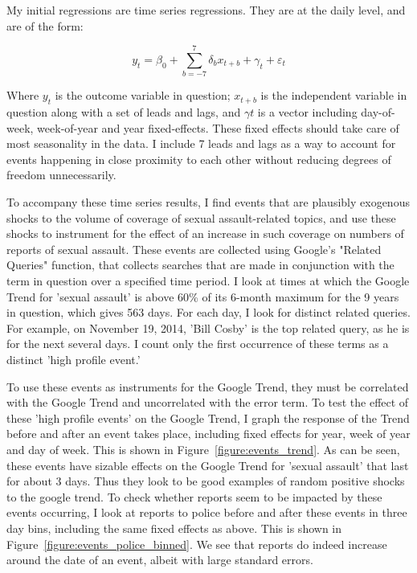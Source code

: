 \documentclass[AER,draftmode]{AEA}
\begin{document}
My initial regressions are time series regressions. They are at the daily level, and are of the form: 

$$ 
y_{t} = \beta_{0} + \sum_{b=-7}^{7} \delta_{b} x_{t+b} + \gamma_{t} + \varepsilon_{t}
$$

Where $y_{t}$ is the outcome variable in question; $x_{t+b}$ is the independent variable in question along with a set of leads and lags, and $\gamma{t}$ is a vector including day-of-week, week-of-year and year fixed-effects. These fixed effects should take care of most seasonality in the data. I include 7 leads and lags as a way to account for events happening in close proximity to each other without reducing degrees of freedom unnecessarily.

To accompany these time series results, I find events that are plausibly exogenous shocks to the volume of coverage of sexual assault-related topics, and use these shocks to instrument for the effect of an increase in such coverage on numbers of reports of sexual assault. These events are collected using Google's "Related Queries" function, that collects searches that are made in conjunction with the term in question over a specified time period. I look at times at which the Google Trend for 'sexual assault' is above 60\% of its 6-month maximum for the 9 years in question, which gives 563 days. For each day, I look for distinct related queries. For example, on November 19, 2014, 'Bill Cosby' is the top related query, as he is for the next several days. I count only the first occurrence of these terms as a distinct 'high profile event.' 

To use these events as instruments for the Google Trend, they must be correlated with the Google Trend and uncorrelated with the error term. To test the effect of these 'high profile events' on the Google Trend, I graph the response of the Trend before and after an event takes place, including fixed effects for year, week of year and day of week. This is shown in Figure~\ref{figure:events_trend}. As can be seen, these events have sizable effects on the Google Trend for 'sexual assault' that last for about 3 days. Thus they look to be good examples of random positive shocks to the google trend. To check whether reports seem to be impacted by these events occurring, I look at reports to police before and after these events in three day bins, including the same fixed effects as above. This is shown in Figure~\ref{figure:events_police_binned}. We see that reports do indeed increase around the date of an event, albeit with large standard errors. 
\end{document}
